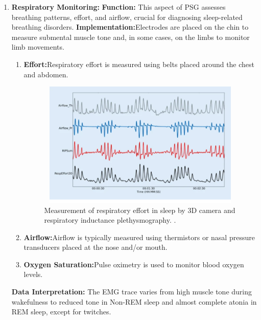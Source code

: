\documentclass[12pt, a4paper,oneside]{book}
\numberwithin{equation}{section}
\begin{document}
\begin{enumerate}
\item \textbf{ Respiratory Monitoring:}\newline
\textbf{Function:} This aspect of PSG assesses breathing patterns, effort, and airflow, crucial for diagnosing sleep-related breathing disorders.\newline
\textbf{Implementation:}Electrodes are placed on the chin to measure submental muscle tone and, in some cases, on the limbs to monitor limb movements.\newline
\begin{enumerate}
\item \textbf{Effort:}Respiratory effort is measured using belts placed around the chest and abdomen.\newline
    \begin{figure}[htb]
    \centerline{\includegraphics[height=6cm,width=15cm]{ef.png}}
    \caption{Measurement of respiratory effort in sleep by 3D camera and respiratory inductance plethysmography. \cite{eff}.}
    \label{fig:A3.4}
    \end{figure}

\item \textbf{Airflow:}Airflow is typically measured using thermistors or nasal pressure transducers placed at the nose and/or mouth.\newline

    
\item \textbf{Oxygen Saturation:}Pulse oximetry is used to monitor blood oxygen levels.

    
\end{enumerate}
\textbf{Data Interpretation:} The EMG trace varies from high muscle tone during wakefulness to reduced tone in Non-REM sleep and almost complete atonia in REM sleep, except for twitches.


\end{enumerate}
\end{document}
